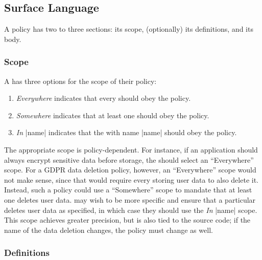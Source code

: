 \subsection{Surface Language}
\label{sec:interface}

A \syslang{} policy has two to three sections: its scope, (optionally) its definitions, and its body.

\subsubsection{Scope}
\label{sec:scope}

A \ce{} has three options for the scope of their policy:
%
\begin{enumerate}[nosep]
    \item \emph{Everywhere} indicates that every \controller{} should obey the policy.
    \item \emph{Somewhere} indicates that at least one \controller{} should obey the policy.
    \item \emph{In} |name| indicates that the \controller{} with name |name| should obey the policy.
\end{enumerate}

The appropriate scope is policy-dependent.
%
For instance, if an application should always encrypt sensitive data before storage,
the \ce{} should select an ``Everywhere'' scope.
%
For a GDPR data deletion policy, however, an ``Everywhere'' scope would not make sense, 
since that would require every \controller{} storing user data to also delete it.
%
Instead, such a policy could use a ``Somewhere'' scope to mandate that at least one \controller{} deletes user data.
%
\Ces{} may wish to be more specific and ensure that a particular \controller{} deletes user data as specified,
in which case they should use the \emph{In} |name| scope.
%
This scope achieves greater precision, but is also tied to the source code; if the name of the data deletion \controller{} changes, the policy must change as well.
%

\subsubsection{Definitions}
\label{sec:definitions}

